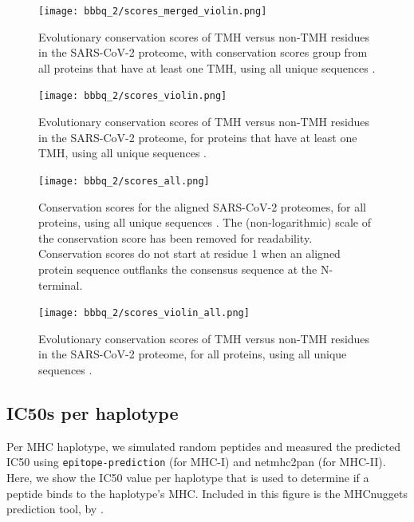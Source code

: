 \begin{figure}[!htbp]
  \texttt{[image: bbbq\_2/scores\_merged\_violin.png]}
  \caption{
    Evolutionary conservation scores of TMH versus non-TMH
    residues in the SARS-CoV-2 proteome,
    with conservation scores group from all proteins that have at least one TMH,
    using all unique sequences .
  }
  \label{fig:evolutionary_conservation_all_unique_merged}
\end{figure}

\begin{figure}[!htbp]
  \texttt{[image: bbbq\_2/scores\_violin.png]}
  \caption{
    Evolutionary conservation scores of TMH versus non-TMH
    residues in the SARS-CoV-2 proteome,
    for proteins that have at least one TMH,
    using all unique sequences .
  }
  \label{fig:evolutionary_conservation_all_unique_violin}
\end{figure}

\begin{figure}[!htbp]
  \texttt{[image: bbbq\_2/scores\_all.png]}
  \caption{
    Conservation scores for the aligned SARS-CoV-2 proteomes,
    for all proteins,
    using all unique sequences .
    The (non-logarithmic) scale of the conservation score has been removed
    for readability.
    Conservation scores do not start at residue 1 when
    an aligned protein sequence outflanks the consensus sequence 
    at the N-terminal.
  }
  \label{fig:evolutionary_conservation_all_unique_all}
\end{figure}

\begin{figure}[!htbp]
  \texttt{[image: bbbq\_2/scores\_violin\_all.png]}
  \caption{
    Evolutionary conservation scores of TMH versus non-TMH
    residues in the SARS-CoV-2 proteome,
    for all proteins,
    using all unique sequences .
  }
  \label{fig:evolutionary_conservation_all_unique_all_violin}
\end{figure}

\subsection{IC50s per haplotype}
\label{subsec:ic50s_per_haplotype}

Per MHC haplotype, we simulated random peptides and measured the
predicted IC50 using \verb;epitope-prediction; (for MHC-I) 
and netmhc2pan (for MHC-II). 
Here, we show the IC50 value per haplotype that
is used to determine if a peptide binds to the haplotype's MHC.
Included in this figure is the MHCnuggets prediction tool,
by \cite{shao2020high}.

